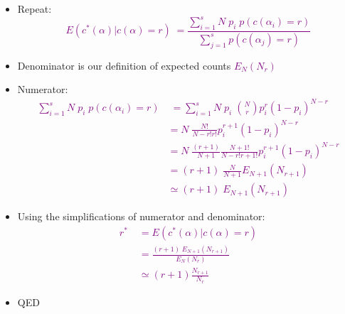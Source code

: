 \documentclass[landscape]{slides}
\newcommand{\maths}[1]{\textcolor{purple}{#1}}
\begin{document}

\vspace{30mm}
\begin{itemize}
\item Repeat:
\maths{\begin{equation*}
E(c^*(\alpha)|c(\alpha)=r) \; = \frac{\sum_{i=1}^s N \; p_i \; p(c(\alpha_i)=r)}{\sum_{j=1}^s p(c(\alpha_j)=r)}
\end{equation*}}
\vspace{10mm}
\item Denominator is our definition of expected counts \maths{$E_N(N_r)$}
\end{itemize}


\begin{itemize}
\item Numerator:
\maths{\begin{equation*}
\begin{split}
\sum_{i=1}^s N \; p_i \; p(c(\alpha_i)=r) &\;= \sum_{i=1}^s N \; p_i \; \binom{N}{r}p_i^r(1-p_i)^{N-r} \\
&= N \; \frac{N!}{N-r!r!} p_i^{r+1}(1-p_i)^{N-r} \\
&= N \; \frac{(r+1)}{N+1} \frac{N+1!}{N-r!r+1!} p_i^{r+1}(1-p_i)^{N-r} \\
&= (r+1) \; \frac{N}{N+1} E_{N+1}(N_{r+1}) \\
&\simeq (r+1) \; E_{N+1}(N_{r+1})
\end{split}
\end{equation*}}
\end{itemize} 


\begin{itemize}
\item Using the simplifications of numerator and denominator:
\maths{\begin{equation*}
\begin{split}
r^* \;&= E(c^*(\alpha)|c(\alpha)=r) \\
&= \frac{(r+1) \; E_{N+1}(N_{r+1})}{E_N(N_r)}\\
&\simeq (r+1) \frac{N_{r+1}}{N_r}
\end{split}
\end{equation*}}
\item QED
\end{itemize}
\end{document}
